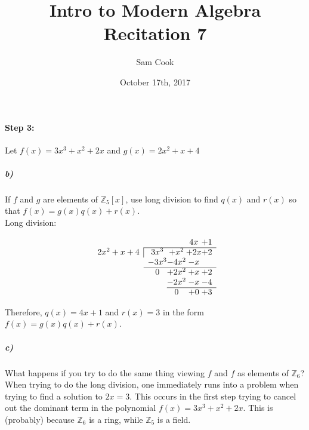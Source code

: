 \documentclass[a4paper,11pt]{article}
\author{Sam Cook}
\title{Intro to Modern Algebra \\Recitation 7}
\date{October 17th, 2017}
\begin{document}
\maketitle

\paragraph{Step 3:\\}
Let $f(x) = 3x^3 + x^2 + 2x$ and $g(x) = 2x^2+x+4$
\subparagraph{b)}
If $f$ and $g$ are elements of $\mathbb{Z}_5[x]$, use long division to find $q(x)$ and $r(x)$ so that $f(x) = g(x)q(x) + r(x)$.\\


Long division:

$$
\begin{array}{rc@{}c@{} c@{}c}
&&& 4x & +1\\ \cline{2-5}
\multicolumn{1}{r|}{2x^2 + x + 4} & 3x^3& +x^2&+2x& +2\\
&-3x^3&-4x^2 &-x&\\ \cline{2-5}
&0&+2x^2&+x& +2\\
&&-2x^2&-x&-4\\ \cline{3-5}
&& 0 & +0& +3\\
\end{array}
$$

Therefore, $q(x) = 4x+1$ and $r(x) = 3$ in the form $f(x) = g(x)q(x) + r(x)$.


\subparagraph{c)}
What happens if you try to do the same thing viewing $f$ and $f$ as elements of $\mathbb{Z}_6$?\\

When trying to do the long division, one immediately runs into a problem when trying to find a solution to $2x = 3$. This occurs in the first step trying to cancel out the dominant term in the polynomial $f(x) = 3x^3 + x^2 + 2x$. This is (probably) because $\mathbb{Z}_6$ is a ring, while $\mathbb{Z}_5$ is a field.
\end{document}
